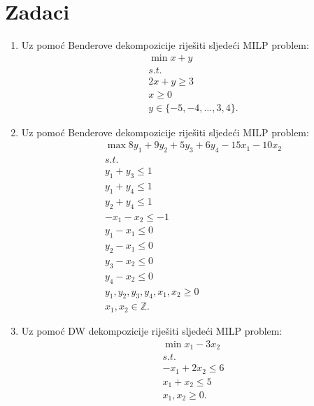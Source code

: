 \documentclass[a4paper, utf8, 11pt, colorlinks]{book}
\begin{document}
\section{Zadaci}
\begin{enumerate}
	\item %
	  	Uz pomoć Benderove dekompozicije riješiti sljedeći MILP problem:
	  \begin{align*}
	  	   &\min x + y \\
	  	   &s.t. \\
	  	   & 2x + y \geq 3 \\
	  	   & x \geq 0 \\
	  	   & y \in \{-5, -4,\ldots, 3, 4\}.
   	  \end{align*}
	\item %
	Uz pomoć Benderove dekompozicije riješiti sljedeći MILP problem:
	\begin{align*}
		 &\max 8 y_1 + 9 y_2 + 5 y_3 + 6 y_4 - 15 x_1 - 10 x_2 \\
		 & s.t.\\
		 &y_1 + y_3 \leq 1 \\
		 & y_1 + y_4 \leq 1 \\
		 &y_2 + y_4 \leq 1 \\
		 & -x_1-x_2 \leq -1 \\
		 & y_1 - x_1 \leq 0 \\
		 & y_2 - x_1 \leq 0 \\
		 & y_3 - x_2 \leq 0 \\
		 & y_4 - x_2 \leq 0 \\
		 & y_1,y_2,y_3,y_4,x_1, x_2 \geq 0 \\
		 & x_1, x_2 \in \mathbb{Z}.
	\end{align*}
\item %
Uz pomoć DW dekompozicije riješiti sljedeći MILP problem:
\begin{align*}
	&\min x_1 - 3 x_2 \\
	& s.t. \\
	& -x_1 + 2x_2 \leq 6 \\
	& x_1 + x_2 \leq 5 \\
	& x_1, x_2 \geq 0.
\end{align*}


\end{enumerate}
\end{document}
